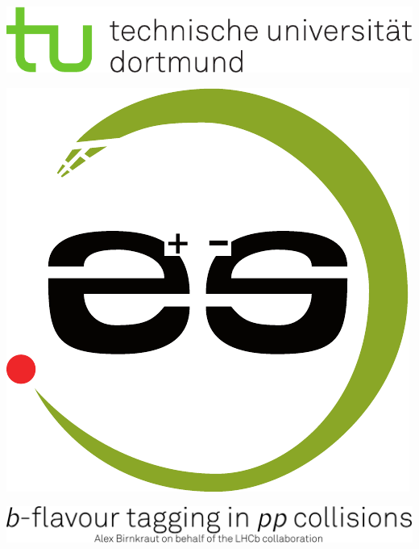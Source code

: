 \documentclass[a0poster,portrait,final,movebody=-5pt]{baposter}
\begin{document}
\begin{poster}
{\begin{minipage}[c]{0.20\textwidth}
\end{minipage}
\begin{minipage}[c]{0.20\textwidth}
\vspace{-1.6cm}\hspace{-2.5cm}
\includegraphics[height=0.3\textwidth]{figures/tud_logo_cmyk.pdf}
\end{minipage}
\begin{minipage}[c]{0.20\textwidth}
\vspace{-1.6cm}\hspace{3.3cm}
\includegraphics[height=0.3\textwidth]{figures/e5logo_green.pdf}
\end{minipage}
\newline
\begin{minipage}{0.8\textwidth}\vspace{2.5cm}\hspace{-19.8cm}
\includegraphics[height=0.075\textwidth]{figures/title.pdf}
\end{minipage}
}
{}

{}


\end{poster}
\end{document}
